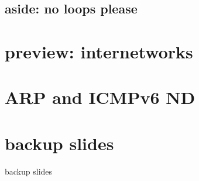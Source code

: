 

\subsection{aside: no loops please}



\section{preview: internetworks}

\section{ARP and ICMPv6 ND}

\section{backup slides}
\begin{frame}{backup slides}
\end{frame}



